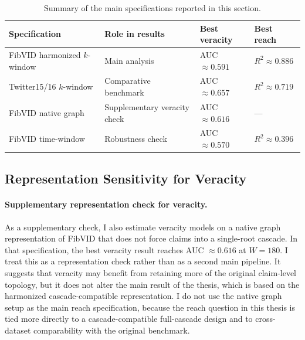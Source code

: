 \begin{table}[htbp]
  \centering
  \caption{Summary of the main specifications reported in this section.}
  \label{tab:representation_summary}
  \begin{tabular}{p{3.5cm}p{3.3cm}p{2.3cm}p{2.3cm}}
    \toprule
    Specification & Role in results & Best veracity & Best reach \\
    \midrule
    FibVID harmonized $k$-window & Main analysis & AUC $\approx 0.591$ & $R^2 \approx 0.886$ \\
    Twitter15/16 $k$-window & Comparative benchmark & AUC $\approx 0.657$ & $R^2 \approx 0.719$ \\
    FibVID native graph & Supplementary veracity check & AUC $\approx 0.616$ & --- \\
    FibVID time-window & Robustness check & AUC $\approx 0.570$ & $R^2 \approx 0.396$ \\
    \bottomrule
  \end{tabular}
\end{table}

\subsection{Representation Sensitivity for Veracity}
\paragraph{Supplementary representation check for veracity.}
As a supplementary check, I also estimate veracity models on a native graph representation of FibVID that does not force claims into a single-root cascade. In that specification, the best veracity result reaches AUC $\approx 0.616$ at $W=180$. I treat this as a representation check rather than as a second main pipeline. It suggests that veracity may benefit from retaining more of the original claim-level topology, but it does not alter the main result of the thesis, which is based on the harmonized cascade-compatible representation. I do not use the native graph setup as the main reach specification, because the reach question in this thesis is tied more directly to a cascade-compatible full-cascade design and to cross-dataset comparability with the original benchmark.

